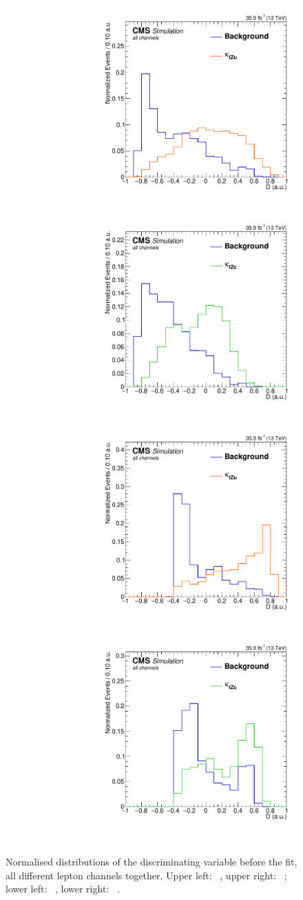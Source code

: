 \begin{figure}[htbp]
	\centering
	\includegraphics[width=0.49\linewidth]{6_Search/Figures/BDTdistributionsNorm/toppair_Zut_BDT_all_Normalized}
	\includegraphics[width=0.49\linewidth]{6_Search/Figures/BDTdistributionsNorm/toppair_Zct_BDT_all_Normalized}
	\includegraphics[width=0.49\linewidth]{6_Search/Figures/BDTdistributionsNorm/singletop_Zut_BDT_all_Normalized}
	\includegraphics[width=0.49\linewidth]{6_Search/Figures/BDTdistributionsNorm/singletop_Zct_BDT_all_Normalized}
	\caption{Normalised distributions of the discriminating variable before the fit, all different lepton channels together. Upper left: \TTSR\ \Zut , upper right: \TTSR\ \Zct ; lower left: \STSR\  \Zut , lower right: \STSR\  \Zct .}
	\label{fig:bdtallnorm}
\end{figure}	

